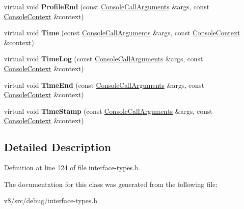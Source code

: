 \begin{DoxyCompactItemize}
virtual void {\bfseries Profile\+End} (const \mbox{\hyperlink{classv8_1_1debug_1_1ConsoleCallArguments}{Console\+Call\+Arguments}} \&args, const \mbox{\hyperlink{classv8_1_1debug_1_1ConsoleContext}{Console\+Context}} \&context)
\item 
\mbox{\label{classv8_1_1debug_1_1ConsoleDelegate_aa8947f375b71bdd27c282e2a863b693a}} 
virtual void {\bfseries Time} (const \mbox{\hyperlink{classv8_1_1debug_1_1ConsoleCallArguments}{Console\+Call\+Arguments}} \&args, const \mbox{\hyperlink{classv8_1_1debug_1_1ConsoleContext}{Console\+Context}} \&context)
\item 
\mbox{\label{classv8_1_1debug_1_1ConsoleDelegate_a19be64673fe72ee43fc05d04d63febfa}} 
virtual void {\bfseries Time\+Log} (const \mbox{\hyperlink{classv8_1_1debug_1_1ConsoleCallArguments}{Console\+Call\+Arguments}} \&args, const \mbox{\hyperlink{classv8_1_1debug_1_1ConsoleContext}{Console\+Context}} \&context)
\item 
\mbox{\label{classv8_1_1debug_1_1ConsoleDelegate_a445d38d6f0406c4ae9fedceddaeb9683}} 
virtual void {\bfseries Time\+End} (const \mbox{\hyperlink{classv8_1_1debug_1_1ConsoleCallArguments}{Console\+Call\+Arguments}} \&args, const \mbox{\hyperlink{classv8_1_1debug_1_1ConsoleContext}{Console\+Context}} \&context)
\item 
\mbox{\label{classv8_1_1debug_1_1ConsoleDelegate_a5affdb73ccb5ac6f343b53eb44b63dab}} 
virtual void {\bfseries Time\+Stamp} (const \mbox{\hyperlink{classv8_1_1debug_1_1ConsoleCallArguments}{Console\+Call\+Arguments}} \&args, const \mbox{\hyperlink{classv8_1_1debug_1_1ConsoleContext}{Console\+Context}} \&context)
\end{DoxyCompactItemize}


\subsection{Detailed Description}


Definition at line 124 of file interface-\/types.\+h.



The documentation for this class was generated from the following file\+:\begin{DoxyCompactItemize}
\item 
v8/src/debug/interface-\/types.\+h\end{DoxyCompactItemize}
